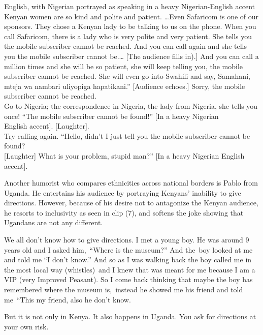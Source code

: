 \documentclass[output=paper]{langsci/langscibook}
\begin{document}
\ea
{English, with Nigerian portrayed as speaking in a heavy Nigerian-English accent}\\
Kenyan women are so kind and polite and patient. …Even Safaricom is one of our sponsors. They chose a Kenyan lady to be talking to us on the phone. When you call Safaricom, there is a lady who is very polite and very patient. She tells you the mobile subscriber cannot be reached. And you can call again and she tells you the mobile subscriber cannot be.… \textup{[The audience fills in).]} And you can call a million times and she will be so patient, she will keep telling you, the mobile subscriber cannot be reached. She will even go into Swahili and say, Samahani, mteja wa nambari uliyopiga hapatikani.” \textup{[Audience echoes.]} Sorry, the mobile subscriber cannot be reached.\\
Go to Nigeria; the correspondence in Nigeria, the lady from Nigeria, she tells you \\
once! “The mobile subscriber cannot be found!”\textup{ [In a heavy Nigerian \\
English accent]. [Laughter].}\\
Try calling again. “Hello, didn’t I just tell you the mobile subscriber cannot be found? \\
\textup{[Laughter] }What is your problem, stupid man?” \textup{[In a heavy Nigerian English accent].}\\
 \citep{Omogi2012b}
\z

  Another humorist who compares ethnicities across national borders is Pablo from Uganda. He entertains his audience by portraying Kenyans’ inability to give directions. However, because of his desire not to antagonize the Kenyan audience, he resorts to inclusivity as seen in clip (7), and softens the joke showing that Ugandans are not any different.

\ea
We all don’t know how to give directions. I met a young boy. He was around 9 years old and I asked him,~“Where is the museum?” And the~boy looked at me and told me “I don’t know.” And so as I was walking back the boy called me in the most local way \textup{(whistles)}~and I knew that was meant for me because I am a VIP (very Improved Peasant). So I come back thinking that maybe the boy has remembered where the museum is,~instead he showed me his friend and told me~“This my friend, also he don’t know. 
\citep{Omogi2012c}
\z

\ea
 But it is not only in Kenya. It also happens in Uganda. You ask for directions at your own risk. 
 \citep{Omogi2012d}
\z
\end{document}
